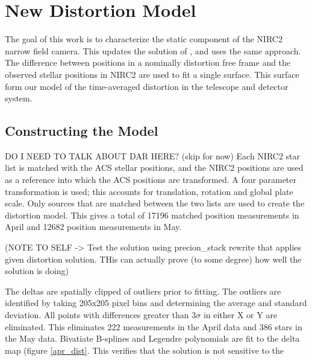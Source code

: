 \section{New Distortion Model}
The goal of this work is to characterize the static component of the NIRC2 narrow field camera.  This updates the solution of \cite{Yelda_2010}, and uses the same approach.  The difference between positions in a nominally distortion free frame and the observed stellar positions in NIRC2 are used to fit a single surface.  This surface form our model of the time-averaged distortion  in the telescope and detector system.

\subsection{Constructing the Model}
DO I NEED TO TALK ABOUT DAR HERE? (skip for now)
Each NIRC2 star list is matched with the ACS stellar positions, and the NIRC2 positions are used as a reference into which the ACS positions are transformed.  A four parameter transformation is used; this accounts for translation, rotation and global plate scale.  Only sources that are matched between the two lists are used to create the distortion model.  This gives a total of 17196 matched position measurements in April and 12682 position measurements in May.  

(NOTE TO SELF -> Test the solution using precion_stack rewrite that applies given distortion solution.  THis can actually prove (to some degree) how well the solution is doing)

The deltas are spatially clipped of outliers prior to fitting.  The outliers are identified by taking 205x205 pixel bins  and determining the average and standard deviation.  All points with differences greater than $3\sigma$ in either X or Y are eliminated.  This eliminates 222 measurements in the April data and 386 stars in the May data.
Bivatiate B-splines and Legendre polynomials are fit to the delta map (figure \ref{apr_dist}.  This verifies that the solution is not sensitive to the 
